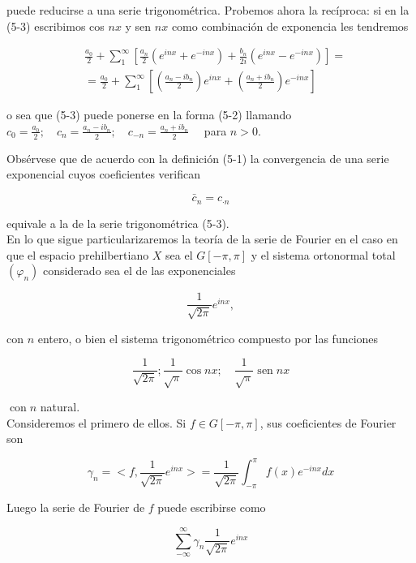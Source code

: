 \documentclass[10pt]{article}
\theoremstyle{plain}
\theoremstyle{definition}
\theoremstyle{remark}
\begin{document}
puede reducirse a una serie trigonométrica. Probemos ahora la recíproca: si en la (5-3) escribimos cos $n x$ y sen $n x$ como combinación de exponencia les tendremos

$$
\begin{aligned}
& \frac{a_{0}}{2}+\sum_{1}^{\infty}\left[\frac{a_{n}}{2}\left(e^{i n x}+e^{-i n x}\right)+\frac{b_{n}}{2 i}\left(e^{i n x}-e^{-i n x}\right)\right]= \\
& =\frac{a_{0}}{2}+\sum_{1}^{\infty}\left[\left(\frac{a_{n}-i b_{n}}{2}\right) e^{i n x}+\left(\frac{a_{n}+i b_{n}}{2}\right) e^{-i n x}\right]
\end{aligned}
$$

o sea que (5-3) puede ponerse en la forma (5-2) llamando\\
$c_{0}=\frac{a_{0}}{2} ; \quad c_{n}=\frac{a_{n}-i b_{n}}{2} ; \quad c_{-n}=\frac{a_{n}+i b_{n}}{2} \quad$ para $n>0$.

Obsérvese que de acuerdo con la definición (5-1) la convergencia de una serie exponencial cuyos coeficientes verifican

$$
\bar{c}_{n}=c_{\cdot n}
$$

equivale a la de la serie trigonométrica (5-3).\\
En lo que sigue particularizaremos la teoría de la serie de Fourier en el caso en que el espacio prehilbertiano $X$ sea el $G[-\pi, \pi]$ y el sistema ortonormal total $\left(\varphi_{n}\right)$ considerado sea el de las exponenciales


\begin{equation*}
\frac{1}{\sqrt{2 \pi}} e^{i n x}, \tag{5-6}
\end{equation*}


con $n$ entero, o bien el sistema trigonométrico compuesto por las funciones

$$
\frac{1}{\sqrt{2 \pi}} ; \frac{1}{\sqrt{\pi}} \cos n x ; \quad \frac{1}{\sqrt{\pi}} \operatorname{sen} n x
$$

$\operatorname{con} n$ natural.\\
Consideremos el primero de ellos. Si $f \in G[-\pi, \pi]$, sus coeficientes de Fourier son

$$
\gamma_{n}=<f, \frac{1}{\sqrt{2 \pi}} e^{i n x}>=\frac{1}{\sqrt{2 \pi}} \int_{-\pi}^{\pi} f(x) e^{-i n x} d x
$$

Luego la serie de Fourier de $f$ puede escribirse como

$$
\sum_{-\infty}^{\infty} \gamma_{n} \frac{1}{\sqrt{2 \pi}} e^{i n x}
$$
\end{document}
